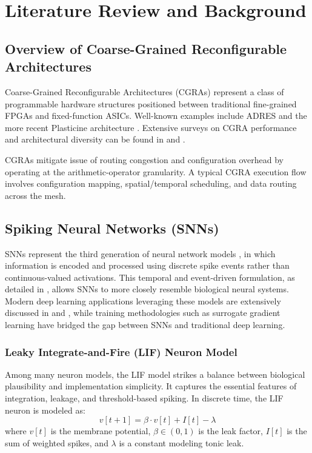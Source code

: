 \section{Literature Review and Background}

\subsection{Overview of Coarse-Grained Reconfigurable Architectures}
Coarse-Grained Reconfigurable Architectures (CGRAs) represent a class of programmable hardware structures positioned between traditional fine-grained FPGAs and fixed-function ASICs. Well-known examples include ADRES \cite{mei2003adres} and the more recent Plasticine architecture \cite{prabhakar2017plasticine}. Extensive surveys on CGRA performance and architectural diversity can be found in \cite{podobas2020survey} and \cite{liu2019survey}.

CGRAs mitigate issue of routing congestion and configuration overhead by operating at the arithmetic-operator granularity. A typical CGRA execution flow involves configuration mapping, spatial/temporal scheduling, and data routing across the mesh.

\subsection{Spiking Neural Networks (SNNs)}
SNNs represent the third generation of neural network models \cite{maass1997networks}, in which information is encoded and processed using discrete spike events rather than continuous-valued activations. This temporal and event-driven formulation, as detailed in \cite{gerstner2002spiking}, allows SNNs to more closely resemble biological neural systems. Modern deep learning applications leveraging these models are extensively discussed in \cite{pfeiffer2018deep} and \cite{roy2019towards}, while training methodologies such as surrogate gradient learning \cite{neftci2019surrogate} have bridged the gap between SNNs and traditional deep learning.

\subsubsection{Leaky Integrate-and-Fire (LIF) Neuron Model}
Among many neuron models, the LIF model strikes a balance between biological plausibility and implementation simplicity. It captures the essential features of integration, leakage, and threshold-based spiking. In discrete time, the LIF neuron is modeled as:
\begin{equation}
    v[t + 1] = \beta \cdot v[t] + I[t] - \lambda
\end{equation}
where $v[t]$ is the membrane potential, $\beta \in (0,1)$ is the leak factor, $I[t]$ is the sum of weighted spikes, and $\lambda$ is a constant modeling tonic leak.

